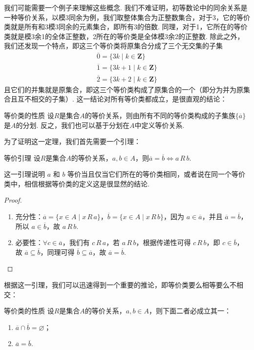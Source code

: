我们可能需要一个例子来理解这些概念. 我们不难证明，初等数论中的同余关系是一种等价关系，以模3同余为例，我们取整体集合为正整数集合，对于3，它的等价类就是所有和3模3同余的元素集合，即所有3的倍数. 同理，对于1，它所在的等价类就是模3余1的全体正整数，2所在的等价类是全体模3余2的正整数. 除此之外，我们还发现一个特点，即这三个等价类将原集合分成了三个无交集的子集
\begin{gather*}
    \overline{0}=\{3k\mid k\in\mathbf{Z}\} \\
    \overline{1}=\{3k+1\mid k\in\mathbf{Z}\} \\
    \overline{2}=\{3k+2\mid k\in\mathbf{Z}\}
\end{gather*}
且它们的并集就是原集合，即这三个等价类构成了原集合的一个（即分为并为原集合且互不相交的子集）. 这一结论对所有等价类都成立，是很直观的结论：
\begin{theorem}{}{等价类的性质}
    设$R$是集合$A$的等价关系，则由所有不同的等价类构成的子集族$\{\overline{a}\}$是$A$的分划. 反之，我们也可以基于分划在$A$中定义等价关系.
\end{theorem}

为了证明这一定理，我们首先需要一个引理：
\begin{lemma}{}{等价引理}
    设$R$是集合$A$的等价关系，$a,b\in A$，则$\overline{a}=\overline{b}\iff a\,R\,b$.
\end{lemma}
这一引理说明 $a$ 和 $b$ 等价当且仅当它们所在的等价类相同，或者说在同一个等价类中，相信根据等价类的定义这是很显然的结论.

\begin{proof}
\begin{enumerate}
    \item 充分性：$\overline{a}=\{ x \in A \mid x \,R\, a \}$，$\overline{b}=\{ x \in A \mid x \,R\, b \}$，因为 $a \in \overline{a}$，并且 $\overline{a} = \overline{b}$，所以 $a \in \overline{b}$，故 $a \,R\, b$.
    \item 必要性：$\forall c \in \overline{a}$，我们有 $c \,R\, a$，若 $a \,R\, b$，根据传递性可得 $c \,R\, b$，即 $c \in \overline{b}$，故 $\overline{a} \subseteq \overline{b}$，同理可得 $\overline{b} \subseteq \overline{a}$，故 $\overline{a} = \overline{b}$.
\end{enumerate}
\end{proof}

根据这一引理，我们可以迅速得到一个重要的推论，即等价类要么相等要么不相交：
\begin{corollary}{}{等价类的性质}
    设$R$是集合$A$的等价关系，$a,b\in A$，则下面二者必成立其一：
    \begin{enumerate}
        \item $\overline{a}\cap\overline{b}=\varnothing$；

        \item $\overline{a}=\overline{b}$.
    \end{enumerate}
\end{corollary}

